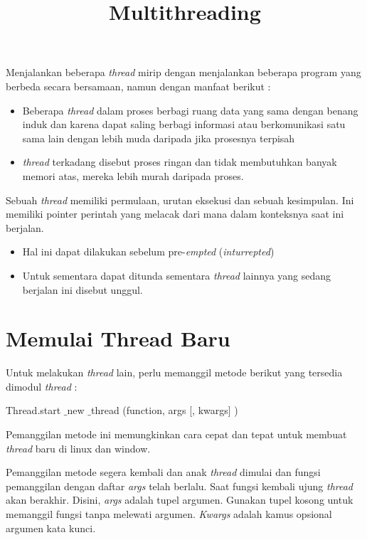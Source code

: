 \documentclass [12pt,a4paper,notitlepage,oneside,bahasa]{article}
\begin{document}
\title{\textbf Multithreading}
\maketitle

Menjalankan beberapa\textit{ thread} mirip dengan menjalankan beberapa program yang berbeda secara bersamaan, namun dengan manfaat berikut :
\begin{itemize}
	\item Beberapa \textit{thread} dalam proses berbagi ruang data yang sama dengan benang induk dan karena dapat saling berbagi informasi atau berkomunikasi satu sama lain dengan lebih muda daripada jika prosesnya terpisah \par
	\item \textit{thread} terkadang disebut proses ringan dan tidak membutuhkan banyak memori atas, mereka lebih murah daripada proses.
\end{itemize}

Sebuah \textit{thread} memiliki permulaan, urutan eksekusi dan sebuah kesimpulan. Ini memiliki pointer perintah yang melacak dari mana dalam konteksnya saat ini berjalan. \par
\begin{itemize}
	\item Hal ini dapat dilakukan sebelum pre-\textit{empted} (\textit{inturrepted})
	\item Untuk sementara dapat ditunda sementara \textit{thread} lainnya yang sedang berjalan ini disebut unggul. 
\end{itemize}
\noindent 
\section{Memulai Thread Baru}

\noindent 
\hspace*{0.5in} Untuk melakukan \textit{thread} lain, perlu memanggil metode berikut yang tersedia dimodul \textit{thread} :
\noindent 

\begin{center}{\fontsize{9pt}{9pt}\selectfont Thread.start $  \_  $new $  \_  $thread (function, args [, kwargs] )}\end{center} \par
Pemanggilan metode ini memungkinkan cara cepat dan tepat untuk membuat \textit{thread} baru di linux dan window. \par
\hspace*{0.5in} Pemanggilan metode segera kembali dan anak  \textit{thread} dimulai dan fungsi pemanggilan dengan daftar \textit{args} telah berlalu. Saat fungsi kembali ujung \textit{thread} akan berakhir. Disini, \textit{args }adalah tupel argumen. Gunakan tupel kosong untuk memanggil fungsi tanpa melewati argumen. \textit{Kwargs} adalah kamus opsional argumen kata kunci.  \par
\end{document}

